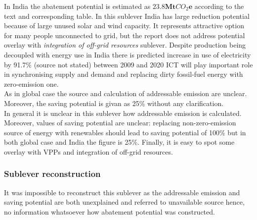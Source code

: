 \documentclass[11pt, twocolumn]{article}
\begin{document}
In India the abatement potential is estimated as $\mathbf{23.8} \mathbf{Mt}CO_2\mathbf{e}$ according to the text and corresponding table. In this sublever India has large reduction potential because of large unused solar and wind capacity. It represents attractive option for many people unconnected to grid, but the report does not address potential overlay with \emph{integration of off-grid resources} sublever. Despite production being decoupled with energy use in India there is predicted increase in use of electricity by 91.7\% (source not stated) between 2009 and 2020 ICT will play important role  in synchronising supply and demand and replacing dirty fossil-fuel energy with zero-emission one.\\
As in global case the source and calculation of addressable emission are unclear. Moreover, the saving potential is givan as 25\% without any clarification.\\

In general it is unclear in this sublever how addressable emission is calculated. Moreover, values of saving potential are unclear: replacing non-zero-emission source of energy with renewables should lead to saving potential of 100\% but in both global case and India the figure is 25\%. Finally, it is easy to spot some overlay with VPPs and integration of off-grid resources.\\

\subsubsection{Sublever reconstruction\label{sec:irpg:reconstruction}}
It was impossible to reconstruct this sublever as the addressable emission and saving potential are both unexplained and referred to unavailable source hence, no information whatsoever how abatement potential was constructed.\\
\end{document}
